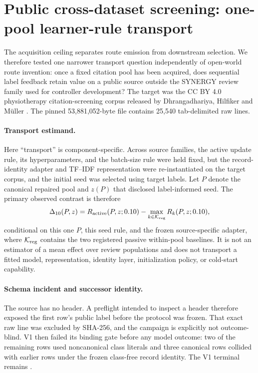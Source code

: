 \section{Public cross-dataset screening: one-pool learner-rule transport}
\label{sec:public-screening-transport}

The acquisition ceiling separates route emission from downstream selection.
We therefore tested one narrower transport question independently of open-world
route invention: once a fixed citation pool has been acquired, does sequential
label feedback retain value on a public source outside the SYNERGY review
family used for controller development?  The target was the CC BY 4.0
physiotherapy citation-screening corpus released by Dhrangadhariya, Hilfiker and
M\"uller \cite{dhrangadhariya2023citationdataset}.  The pinned 53,881,052-byte
file contains 25,540 tab-delimited raw lines.

\paragraph{Transport estimand.}
Here ``transport'' is component-specific. Across source families, the active
update rule, its hyperparameters, and the batch-size rule were held fixed, but the record-identity
adapter and TF--IDF representation were re-instantiated on the target corpus,
and the initial seed was selected using target labels. Let $P$ denote the
canonical repaired pool and $z(P)$ that disclosed label-informed seed. The
primary observed contrast is therefore
\[
 \Delta_{10}(P,z)=
 R_{\rm active}(P,z;0.10)-
 \max_{k\in\mathcal K_{\rm reg}}R_k(P,z;0.10),
\]
conditional on this one $P$, this seed rule, and the frozen source-specific
adapter, where $\mathcal K_{\rm reg}$ contains the two registered passive
within-pool baselines. It is not an estimator of a mean effect over review populations and
does not transport a fitted model, representation, identity layer,
initialization policy, or cold-start capability.

\paragraph{Schema incident and successor identity.}
The source has no header.  A preflight intended to inspect a header therefore
exposed the first row's public label before the protocol was frozen.  That exact
raw line was excluded by SHA-256, and the campaign is explicitly not
outcome-blind.  V1 then failed its binding gate before any model outcome: two of
the remaining rows used noncanonical class literals and three canonical rows
collided with earlier rows under the frozen class-free record identity.  The V1
terminal remains
.

